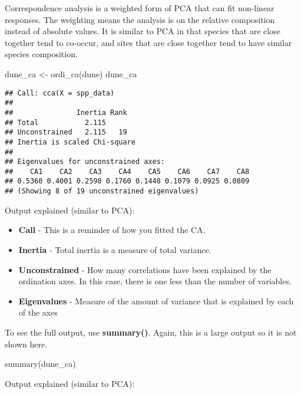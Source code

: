 \documentclass[
]{article}
\newenvironment{Shaded}{\begin{snugshade}}{\end{snugshade}}
\newcommand{\FunctionTok}[1]{\textcolor[rgb]{0.00,0.00,0.00}{#1}}
\newcommand{\NormalTok}[1]{#1}
\newcommand{\OtherTok}[1]{\textcolor[rgb]{0.56,0.35,0.01}{#1}}
\providecommand{\tightlist}{%
  \setlength{\itemsep}{0pt}\setlength{\parskip}{0pt}}
\begin{document}
Correspondence analysis is a weighted form of PCA that can fit
non-linear responses. The weighting means the analysis is on the
relative composition instead of absolute values. It is similar to PCA in
that species that are close together tend to co-occur, and sites that
are close together tend to have similar species composition.

\begin{Shaded}
\begin{Highlighting}[]
\NormalTok{dune\_ca }\OtherTok{\textless{}{-}} \FunctionTok{ordi\_ca}\NormalTok{(dune)}
\NormalTok{dune\_ca}
\end{Highlighting}
\end{Shaded}

\begin{verbatim}
## Call: cca(X = spp_data)
## 
##               Inertia Rank
## Total           2.115     
## Unconstrained   2.115   19
## Inertia is scaled Chi-square 
## 
## Eigenvalues for unconstrained axes:
##    CA1    CA2    CA3    CA4    CA5    CA6    CA7    CA8 
## 0.5360 0.4001 0.2598 0.1760 0.1448 0.1079 0.0925 0.0809 
## (Showing 8 of 19 unconstrained eigenvalues)
\end{verbatim}

Output explained (similar to PCA):

\begin{itemize}
\tightlist
\item
  \textbf{Call} - This is a reminder of how you fitted the CA.
\item
  \textbf{Inertia} - Total inertia is a measure of total variance.
\item
  \textbf{Unconstrained} - How many correlations have been explained by
  the ordination axes. In this case, there is one less than the number
  of variables.
\item
  \textbf{Eigenvalues} - Measure of the amount of variance that is
  explained by each of the axes
\end{itemize}

To see the full output, use \textbf{summary()}. Again, this is a large
output so it is not shown here.

\begin{Shaded}
\begin{Highlighting}[]
\FunctionTok{summary}\NormalTok{(dune\_ca)}
\end{Highlighting}
\end{Shaded}

Output explained (similar to PCA):
\end{document}
